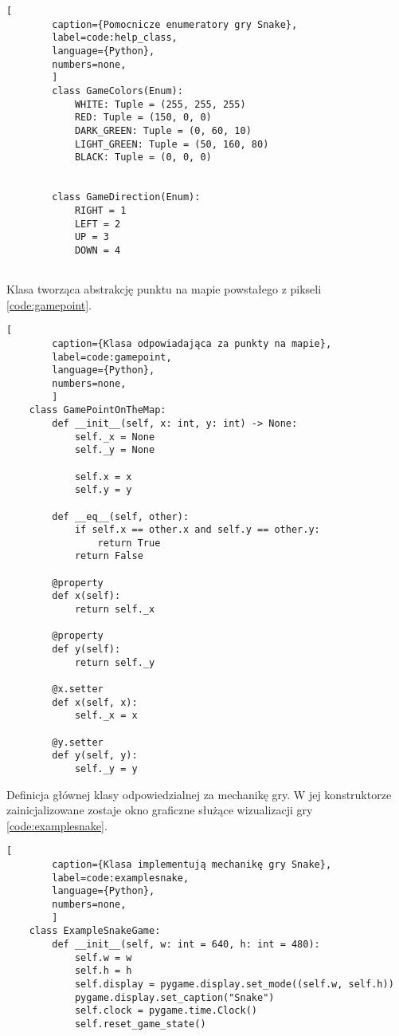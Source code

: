 \begin{onepage}
    \begin{lstlisting}[
        caption={Pomocnicze enumeratory gry Snake},
        label=code:help_class,
        language={Python},
        numbers=none,
        ]
        class GameColors(Enum):
            WHITE: Tuple = (255, 255, 255)
            RED: Tuple = (150, 0, 0)
            DARK_GREEN: Tuple = (0, 60, 10)
            LIGHT_GREEN: Tuple = (50, 160, 80)
            BLACK: Tuple = (0, 0, 0)
        
        
        class GameDirection(Enum):
            RIGHT = 1
            LEFT = 2
            UP = 3
            DOWN = 4
        
    \end{lstlisting}
\end{onepage}

\clearpage

Klasa tworząca abstrakcję punktu na mapie powstałego z pikseli \ref{code:gamepoint}.

\begin{onepage}
    \begin{lstlisting}[
        caption={Klasa odpowiadająca za punkty na mapie},
        label=code:gamepoint,
        language={Python},
        numbers=none,
        ]
    class GamePointOnTheMap:
        def __init__(self, x: int, y: int) -> None:
            self._x = None
            self._y = None
    
            self.x = x
            self.y = y
    
        def __eq__(self, other):
            if self.x == other.x and self.y == other.y:
                return True
            return False
    
        @property
        def x(self):
            return self._x
    
        @property
        def y(self):
            return self._y
    
        @x.setter
        def x(self, x):
            self._x = x
    
        @y.setter
        def y(self, y):
            self._y = y
    \end{lstlisting}
\end{onepage}

Definicja głównej klasy odpowiedzialnej za mechanikę gry. W jej konstruktorze zainicjalizowane zostaje okno graficzne służące wizualizacji gry \ref{code:examplesnake}.

\begin{onepage}
    \begin{lstlisting}[
        caption={Klasa implementują mechanikę gry Snake},
        label=code:examplesnake,
        language={Python},
        numbers=none,
        ]
    class ExampleSnakeGame:
        def __init__(self, w: int = 640, h: int = 480):
            self.w = w
            self.h = h
            self.display = pygame.display.set_mode((self.w, self.h))
            pygame.display.set_caption("Snake")
            self.clock = pygame.time.Clock()
            self.reset_game_state()
    \end{lstlisting}
\end{onepage}

